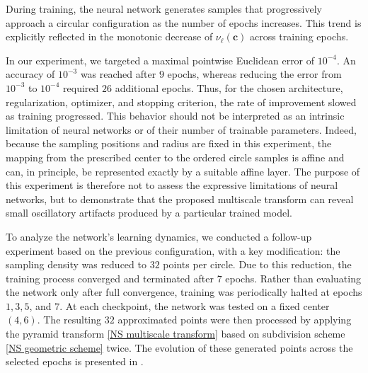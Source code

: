 \documentclass[11pt,a4paper]{article}
\theoremstyle{definition}
\begin{document}
During training, the neural network generates samples that progressively approach a circular configuration as the number of epochs increases. This trend is explicitly reflected in the monotonic decrease of $\nu_\ell(\boldsymbol{c})$ across training epochs.

In our experiment, we targeted a maximal pointwise Euclidean error of $10^{-4}$. An accuracy of $10^{-3}$ was reached after $9$ epochs, whereas reducing the error from $10^{-3}$ to $10^{-4}$ required $26$ additional epochs. Thus, for the chosen architecture, regularization, optimizer, and stopping criterion, the rate of improvement slowed as training progressed. This behavior should not be interpreted as an intrinsic limitation of neural networks or of their number of trainable parameters. Indeed, because the sampling positions and radius are fixed in this experiment, the mapping from the prescribed center to the ordered circle samples is affine and can, in principle, be represented exactly by a suitable affine layer. The purpose of this experiment is therefore not to assess the expressive limitations of neural networks, but to demonstrate that the proposed multiscale transform can reveal small oscillatory artifacts produced by a particular trained model.

To analyze the network's learning dynamics, we conducted a follow-up experiment based on the previous configuration, with a key modification: the sampling density was reduced to $32$ points per circle. Due to this reduction, the training process converged and terminated after $7$ epochs. Rather than evaluating the network only after full convergence, training was periodically halted at epochs $1, 3, 5$, and $7$. At each checkpoint, the network was tested on a fixed center $(4, 6)$. The resulting $32$ approximated points were then processed by applying the pyramid transform \eqref{NS multiscale transform} based on subdivision scheme \eqref{NS geometric scheme} twice. The evolution of these generated points across the selected epochs is presented in .
\end{document}
